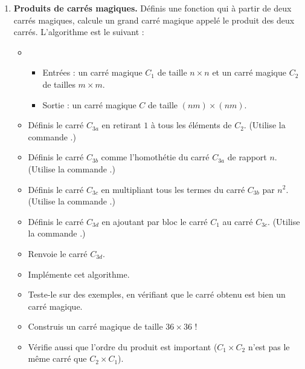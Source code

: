 \documentclass[11pt,class=report,crop=false]{standalone}
\begin{document}
\begin{activite}
\begin{enumerate}
 \item \textbf{Produits de carrés magiques.} Définis une fonction  qui à partir de deux carrés magiques, calcule un grand carré magique appelé le produit des deux carrés. L'algorithme est le suivant :

 \begin{algorithme}
  \sauteligne 
 \begin{itemize}
   \item
   \begin{itemize}
     \item Entrées : un carré magique $C_1$ de taille $n\times n$ et un carré magique $C_2$ de tailles $m\times m$.
     \item Sortie : un carré magique $C$ de taille $(nm)\times(nm)$.
   \end{itemize}

  \item Définis le carré $C_{3a}$ en retirant $1$ à tous les éléments de $C_2$. (Utilise la commande .)
  
  \item Définis le carré $C_{3b}$ comme l'homothétie du carré $C_{3a}$ de rapport $n$. (Utilise la commande .)
  
  \item Définis le carré $C_{3c}$ en multipliant tous les termes du carré $C_{3b}$ par $n^2$. (Utilise la commande .)
  
  \item Définis le carré $C_{3d}$ en ajoutant par bloc le carré $C_1$ au carré $C_{3c}$. (Utilise la commande .)
  
  \item Renvoie le carré $C_{3d}$.
   
 \end{itemize}  
 \end{algorithme}
 
 \begin{itemize}
   \item Implémente cet algorithme. 
   \item Teste-le sur des exemples, en vérifiant que le carré obtenu est bien un carré magique.
   \item Construis un carré magique de taille $36 \times 36$ !
   \item Vérifie aussi que l'ordre du produit est important ($C_1 \times C_2$ n'est pas le même carré que $C_2 \times C_1$). 
  \end{itemize}  

\end{enumerate}

\end{activite}
\end{document}
